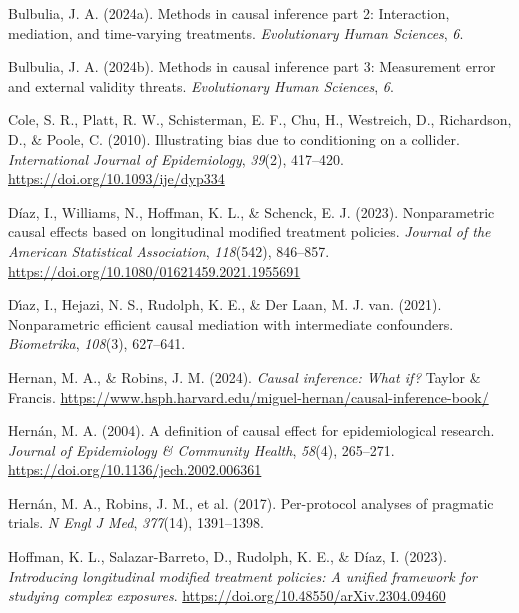 \documentclass[
  single column]{article}
\newlength{\cslhangindent}
\newenvironment{CSLReferences}[2] %
 {\begin{list}{}{%
  \setlength{\itemindent}{0pt}
  \setlength{\leftmargin}{0pt}
  \setlength{\parsep}{0pt}
  \ifodd #1
   \setlength{\leftmargin}{\cslhangindent}
   \setlength{\itemindent}{-1\cslhangindent}
  \fi
  \setlength{\itemsep}{#2\baselineskip}}}
 {\end{list}}
\begin{document}
\label{refs}
\begin{CSLReferences}{1}{0}
Bulbulia, J. A. (2024a). Methods in causal inference part 2:
Interaction, mediation, and time-varying treatments. \emph{Evolutionary
Human Sciences}, \emph{6}.

Bulbulia, J. A. (2024b). Methods in causal inference part 3: Measurement
error and external validity threats. \emph{Evolutionary Human Sciences},
\emph{6}.

Cole, S. R., Platt, R. W., Schisterman, E. F., Chu, H., Westreich, D.,
Richardson, D., \& Poole, C. (2010). Illustrating bias due to
conditioning on a collider. \emph{International Journal of
Epidemiology}, \emph{39}(2), 417--420.
\url{https://doi.org/10.1093/ije/dyp334}

Díaz, I., Williams, N., Hoffman, K. L., \& Schenck, E. J. (2023).
Nonparametric causal effects based on longitudinal modified treatment
policies. \emph{Journal of the American Statistical Association},
\emph{118}(542), 846--857.
\url{https://doi.org/10.1080/01621459.2021.1955691}

Dı́az, I., Hejazi, N. S., Rudolph, K. E., \& Der Laan, M. J. van. (2021).
Nonparametric efficient causal mediation with intermediate confounders.
\emph{Biometrika}, \emph{108}(3), 627--641.

Hernan, M. A., \& Robins, J. M. (2024). \emph{Causal inference: What
if?} Taylor \& Francis.
\url{https://www.hsph.harvard.edu/miguel-hernan/causal-inference-book/}

Hernán, M. A. (2004). A definition of causal effect for epidemiological
research. \emph{Journal of Epidemiology \& Community Health},
\emph{58}(4), 265--271. \url{https://doi.org/10.1136/jech.2002.006361}

Hernán, M. A., Robins, J. M., et al. (2017). Per-protocol analyses of
pragmatic trials. \emph{N Engl J Med}, \emph{377}(14), 1391--1398.

Hoffman, K. L., Salazar-Barreto, D., Rudolph, K. E., \& Díaz, I. (2023).
\emph{Introducing longitudinal modified treatment policies: A unified
framework for studying complex exposures}.
\url{https://doi.org/10.48550/arXiv.2304.09460}


\end{CSLReferences}
\end{document}
